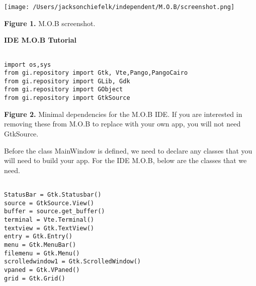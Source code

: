 \documentclass[12pt]{article}
\begin{document}
\vspace{0.05cm}

\begin{center}
\begin{minipage}[b]{0.66\linewidth}
\texttt{[image: /Users/jacksonchiefelk/independent/M.O.B/screenshot.png]}
\end{minipage}
\end{center}

\vspace{0.05cm}

\begin{center}{\footnotesize{\textbf{Figure 1.}  M.O.B screenshot.}} \end{center} 

\vspace{0.3cm}



\begin{center}{\Large{\textbf{IDE M.O.B Tutorial}}}\end{center}
{\footnotesize{
\begin{lstlisting}

import os,sys
from gi.repository import Gtk, Vte,Pango,PangoCairo
from gi.repository import GLib, Gdk
from gi.repository import GObject
from gi.repository import GtkSource

\end{lstlisting}
}}

\vspace{0.3cm}

\textbf{Figure 2.}  Minimal dependencies for the M.O.B IDE.  If you are interested in removing these from M.O.B to replace with your own app, you will not need GtkSource. 

\vspace{0.4cm}

\indent Before the class MainWindow is defined, we need to declare any classes that you will need to build your app.  For the IDE M.O.B, below are the classes that we need.

{\footnotesize{
\begin{lstlisting}

StatusBar = Gtk.Statusbar()
source = GtkSource.View()
buffer = source.get_buffer()
terminal = Vte.Terminal()
textview = Gtk.TextView()
entry = Gtk.Entry()
menu = Gtk.MenuBar()
filemenu = Gtk.Menu()
scrolledwindow1 = Gtk.ScrolledWindow()
vpaned = Gtk.VPaned()
grid = Gtk.Grid()


\end{lstlisting}    
}}
\end{document}
